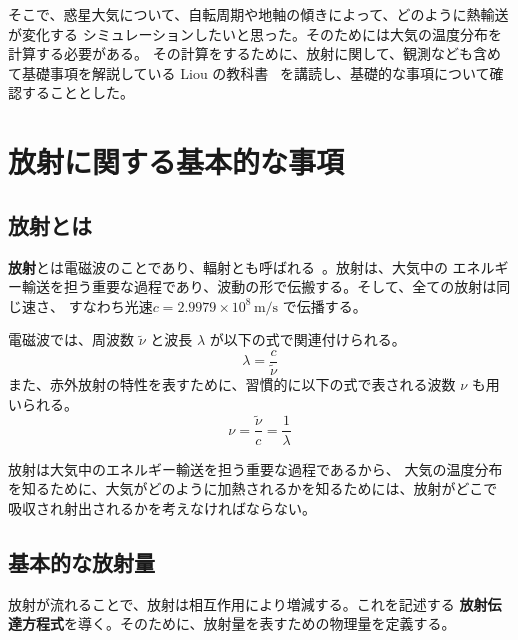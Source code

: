 \documentclass[book]{dennou777}
\newcommand{\hmunit}[1]{\,\mathrm{#1}}
\newcommand{\hmemph}[1]{\textbf{#1}}
\begin{document}
そこで、惑星大気について、自転周期や地軸の傾きによって、どのように熱輸送が変化する
シミュレーションしたいと思った。そのためには大気の温度分布を計算する必要がある。
その計算をするために、放射に関して、観測なども含めて基礎事項を解説している Liou
の教科書~\cite{liou} を講読し、基礎的な事項について確認することとした。

\chapter{放射に関する基本的な事項}

\section{放射とは}

\hmemph{放射}とは電磁波のことであり、輻射とも呼ばれる~\cite{asano}。放射は、大気中の
エネルギー輸送を担う重要な過程であり、波動の形で伝搬する。そして、全ての放射は同じ速さ、
すなわち光速\(c=2.9979\times10^8\hmunit{m/s}\) で伝播する。

電磁波では、周波数 \(\tilde\nu\) と波長 \(\lambda\) が以下の式で関連付けられる。
\begin{equation}
	\lambda=\frac{c}{\tilde\nu}
\end{equation}
また、赤外放射の特性を表すために、習慣的に以下の式で表される波数 \(\nu\) も用いられる。
\begin{equation}
	\nu=\frac{\tilde\nu}{c}=\frac{1}{\lambda}
\end{equation}

放射は大気中のエネルギー輸送を担う重要な過程であるから、
大気の温度分布を知るために、大気がどのように加熱されるかを知るためには、放射がどこで
吸収され射出されるかを考えなければならない。

\section{基本的な放射量}

放射が流れることで、放射は相互作用により増減する。これを記述する
\hmemph{放射伝達方程式}を導く。そのために、放射量を表すための物理量を定義する。
\end{document}
